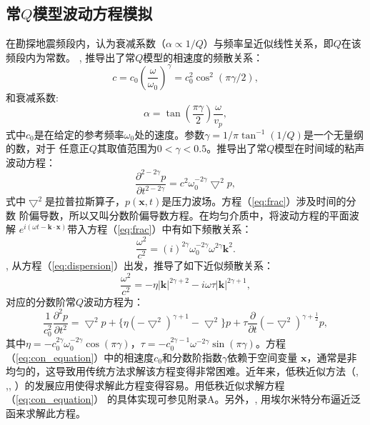 \subsection{常$Q$模型波动方程模拟}
在勘探地震频段内，认为衰减系数（$\alpha\propto 1/Q$）与频率呈近似线性关系，即$Q$在该频段内为常数。
, 推导出了常$Q$模型的相速度的频散关系：
\begin{equation}
	c=c_0(\frac{\omega}{\omega_0})^\gamma=c_0^2\cos^2(\pi\gamma/2),
\end{equation}
和衰减系数:
\begin{equation}
	\alpha=\tan(\frac{\pi\gamma}{2})\frac{\omega}{v_p},
\end{equation}
式中$c_0$是在给定的参考频率$\omega_0$处的速度。参数$\gamma=1/\pi\tan^{-1}(1/Q)$是一个无量纲的数，对于
任意正$Q$其取值范围为$0<\gamma<0.5$。推导出了常$Q$模型在时间域的粘声波动方程：
\begin{equation}
	\frac{\partial^{2-2\gamma}p}{\partial t^{2-2\gamma}}=c^2\omega_0^{-2\gamma}\bigtriangledown^2p,
	\label{eq:frac}
\end{equation}
式中$\bigtriangledown^2$是拉普拉斯算子，$p(\mathbf{x},t)$是压力波场。方程（\ref{eq:frac}）涉及时间的分数
阶偏导数，所以又叫分数阶偏导数方程。在均匀介质中，将波动方程的平面波解
$e^{i(\omega t-\mathbf{k}\cdot\mathbf{x})}$带入方程（\ref{eq:frac}）中有如下频散关系：
\begin{equation}
	\frac{\omega^2}{c^2}=(i)^{2\gamma}\omega_0^{-2\gamma}\omega^{2\gamma}\mathbf{k}^2.
	\label{eq:dispersion}
\end{equation}
, 从方程（\ref{eq:dispersion}）出发，推导了如下近似频散关系：
\begin{equation}
	\frac{\omega^2}{c^2}=-\eta|\mathbf{k}|^{2\gamma+2}-i\omega\tau|\mathbf{k}|^{2\gamma+1},
	\label{eq:dispersion1}
\end{equation}
对应的分数阶常$Q$波动方程为：
\begin{equation}
	\frac{1}{c_0^2}\frac{\partial^2p}{\partial t^2}=\bigtriangledown^2p + \{\eta(-\bigtriangledown^2)^
	{\gamma+1}-\bigtriangledown^2\}p + \tau\frac{\partial}{\partial t}(-\bigtriangledown^2)^{\gamma+
	\frac{1}{2}}p,
	\label{eq:con_equation}
\end{equation}
其中$\eta=-c_0^{2\gamma}\omega_0^{-2\gamma}\cos(\pi\gamma)$，$\tau=-c_0^{2\gamma-1}\omega^{-2\gamma}
\sin(\pi\gamma)$。方程（\ref{eq:con_equation}）中的相速度$c_0$和分数阶指数$\gamma$依赖于空间变量
$\mathbf{x}$，通常是非均匀的，这导致用传统方法求解该方程变得非常困难。近年来，低秩近似方法（, 
,, ）的发展应用使得求解此方程变得容易。用低秩近似求解方程（\ref{eq:con_equation}）
的具体实现可参见附录A。另外，, 用埃尔米特分布逼近泛函来求解此方程。


